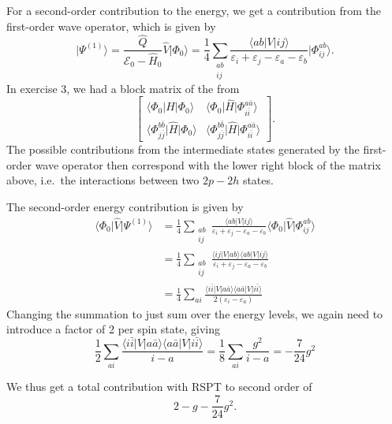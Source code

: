 
For a second-order contribution to the energy, we get a contribution from the first-order wave operator, which is given by
\begin{equation*}
    \vert \Psi^{(1)} \rangle = \frac{\hat{Q}}{\mathcal{E}_0 - \hat{H}_0} \hat{V} \vert \Phi_0 \rangle = \frac{1}{4} \sum_{\substack{ab \\ ij}} \frac{\langle ab \vert V \vert ij \rangle}{\varepsilon_i + \varepsilon_j - \varepsilon_a - \varepsilon_b} \vert \Phi_{ij}^{ab} \rangle.
\end{equation*}
In exercise 3, we had a block matrix of the from
\begin{equation*}
    \begin{bmatrix}
        \langle \Phi_0 \vert \hat{H} \vert \Phi_0 \rangle & \langle \Phi_0 \vert \hat{H} \vert \Phi_{i\bar{i}}^{a\bar{a}} \rangle \\
        \langle \Phi_{j\bar{j}}^{b\bar{b}} \vert \hat{H} \vert \Phi_0 \rangle & \langle \Phi_{j\bar{j}}^{b\bar{b}} \vert \hat{H} \vert \Phi_{i\bar{i}}^{a\bar{a}} \rangle
    \end{bmatrix}.
\end{equation*}
The possible contributions from the intermediate states generated by the first-order wave operator then correspond with the lower right block of the matrix above, i.e.\ the interactions between two $2p-2h$ states.

The second-order energy contribution is given by
\begin{align*}
    \langle \Phi_0 \vert \hat{V} \vert \Psi^{(1)} \rangle &= \frac{1}{4} \sum_{\substack{ab \\ ij}} \frac{\langle ab \vert V \vert ij \rangle}{\varepsilon_i + \varepsilon_j - \varepsilon_a - \varepsilon_b} \langle \Phi_0 \vert \hat{V} \vert \Phi_{ij}^{ab} \rangle \\
    &= \frac{1}{4} \sum_{\substack{ab \\ ij}} \frac{\langle ij \vert V \vert ab \rangle \langle ab \vert V \vert ij \rangle }{\varepsilon_i + \varepsilon_j - \varepsilon_a - \varepsilon_b} \\
    &= \frac{1}{4} \sum_{ai} \frac{
        \langle i\bar{i} \vert V \vert a\bar{a} \rangle %
        \langle a\bar{a} \vert V \vert i\bar{i} \rangle %
    }{2(\varepsilon_i - \varepsilon_a)}
\end{align*}
Changing the summation to just sum over the energy levels, we again need to introduce a factor of 2 per spin state, giving
\begin{equation*}
    \frac{1}{2} \sum_{ai} \frac{
        \langle i\bar{i} \vert V \vert a\bar{a} \rangle %
        \langle a\bar{a} \vert V \vert i\bar{i} \rangle %
    }{i - a} = \frac{1}{8} \sum_{ai} \frac{g^2}{i - a} = -\frac{7}{24} g^2
\end{equation*}

We thus get a total contribution with RSPT to second order of
\begin{equation*}
    2 - g - \frac{7}{24} g^2.
\end{equation*}
